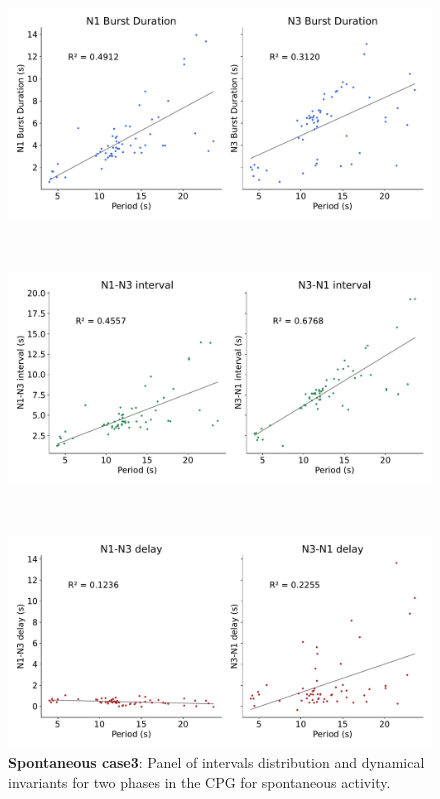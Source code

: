 \begin{figure}[htbp]
\begin{minipage}{0.9\textwidth}
\begin{minipage}[b]{0.53\textwidth}
			\begin{minipage}[b]{\textwidth}
				\centering
				\includegraphics[width=\textwidth]{./invariants/data/SUSSEX/prep3/images/prep3_durations.pdf}
			\end{minipage}\\
			\begin{minipage}[b]{\textwidth}
				\centering
				\includegraphics[width=\textwidth]{./invariants/data/SUSSEX/prep3/images/prep3_intervals.pdf}
			\end{minipage}\\
			\begin{minipage}[b]{\textwidth}
				\centering
				\includegraphics[width=\textwidth]{./invariants/data/SUSSEX/prep3/images/prep3_delays.pdf}
			\end{minipage}
		\end{minipage}
	\end{minipage}
	\caption{\textbf{Spontaneous case3}: Panel of intervals distribution and dynamical invariants for two phases in the CPG for spontaneous activity.}
	\label{fig:prep3 2phases invariants}
\end{figure}

